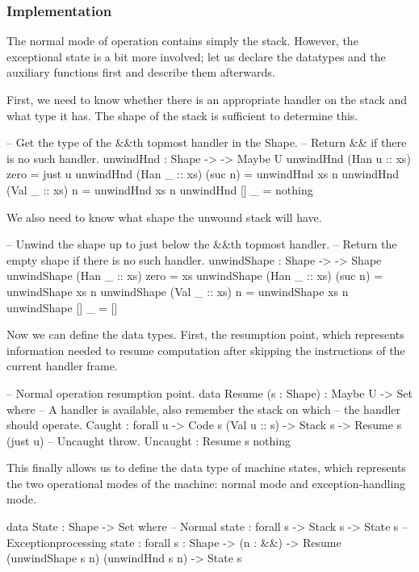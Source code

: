 
\subsubsection{Implementation}

The normal mode of operation contains simply the stack. However, the exceptional state
is a bit more involved; let us declare the datatypes and the auxiliary functions first
and describe them afterwards.

First, we need to know whether there is an appropriate handler on the stack and what type
it has. The shape of the stack is sufficient to determine this.
\begin{code}
  -- Get the type of the &&\-th top\-most handler in the Shape.
  -- Return && if there is no such handler.
  unwindHnd : Shape -> \bN -> Maybe U
  unwindHnd (Han u :: xs) zero    = just u
  unwindHnd (Han _ :: xs) (suc n) = unwindHnd xs n
  unwindHnd (Val _ :: xs) n       = unwindHnd xs n
  unwindHnd []           _       = nothing
\end{code}

\noindent We also need to know what shape the unwound stack will have.
\label{sec:ham-unwindShape}\begin{code}
  -- Unwind the shape up to just below the &&\-th top\-most handler.
  -- Return the empty shape if there is no such handler.
  unwindShape : Shape -> \bN -> Shape
  unwindShape (Han _ :: xs) zero    = xs
  unwindShape (Han _ :: xs) (suc n) = unwindShape xs n
  unwindShape (Val _ :: xs) n       = unwindShape xs n
  unwindShape []           _       = []
\end{code}

\noindent Now we can define the data types. First, the resumption point, which
represents information needed to resume computation after skipping the instructions
of the current handler frame.
\begin{code}
  -- Normal operation resumption point.
  data Resume (s : Shape) : Maybe U -> Set where
    -- A handler is available, also remember the stack on which
    -- the handler should operate.
    Caught : forall {u} -> Code s (Val u :: s) -> Stack s -> Resume s (just u)
    -- Uncaught throw.
    Uncaught : Resume s nothing
\end{code}

\noindent This finally allows us to define the data type of machine states, which represents
the two operational modes of the machine: normal mode and exception-handling mode.
\begin{code}
  data State : Shape -> Set where
  	-- Normal state
  	\tick[_] : forall {s} -> Stack s -> State s
  	-- Exception\-processing state
  	\x[_,_] : forall {s : Shape}
  	  -> (n : \bN&\!&)
  	  -> Resume (unwindShape s n) (unwindHnd s n)
  	  -> State s
\end{code}

